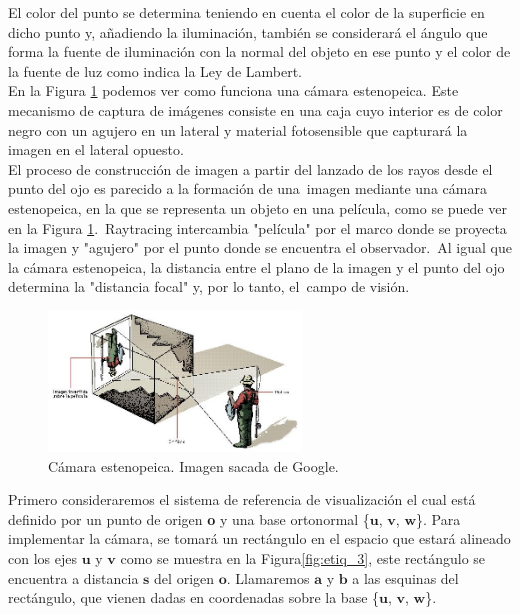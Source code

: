 El color del punto se determina teniendo en cuenta el color de la superficie en dicho punto y, añadiendo la iluminación, también se considerará el ángulo que forma la fuente de iluminación con la normal del objeto en ese punto y el color de la fuente de luz como indica la Ley de Lambert.
	${ }$\\	


En la Figura \ref{fig:etiq_1} podemos ver como funciona una cámara estenopeica. Este mecanismo de captura de imágenes consiste en una caja cuyo interior es de color negro con un agujero en un lateral y material fotosensible que capturará la imagen en el lateral opuesto.
${ }$\\

El proceso de construcción de imagen a partir del lanzado de los rayos desde el punto del ojo es parecido a la formación de una imagen mediante una cámara estenopeica, en la que se representa un objeto en una película, como se puede ver en la Figura \ref{fig:etiq_1}. Raytracing intercambia "película" por el marco donde se proyecta la imagen y "agujero" por el punto donde se encuentra el observador. Al igual que la cámara estenopeica, la distancia entre el plano de la imagen y el punto del ojo determina la "distancia focal" y, por lo tanto, el campo de visión.
${ }$\\
	


\begin{figure}[h]
	\begin{center}
		\includegraphics[width=0.6\textwidth]{imagenes/camara-estenopeica.jpg}
	\end{center}
	\caption{Cámara estenopeica. Imagen sacada de Google.}
	\label{fig:etiq_1}
\end{figure}

Primero consideraremos el sistema de referencia de visualización el cual está definido por un punto de origen \textbf{o} y una base ortonormal \{$\textbf{u}$, $\textbf{v}$, $\textbf{w}$\}. Para implementar la cámara, se tomará un rectángulo en el espacio que estará alineado con los ejes $\textbf{u}$ y $\textbf{v}$ como se muestra en la Figura\ref{fig:etiq_3}, este rectángulo se encuentra a distancia $\textbf{s}$ del origen $\textbf{o}$. Llamaremos $\textbf{a}$ y $\textbf{b}$ a las esquinas del rectángulo, que vienen dadas en coordenadas sobre la base \{$\textbf{u}$, $\textbf{v}$, $\textbf{w}$\}.
	${ }$\\

